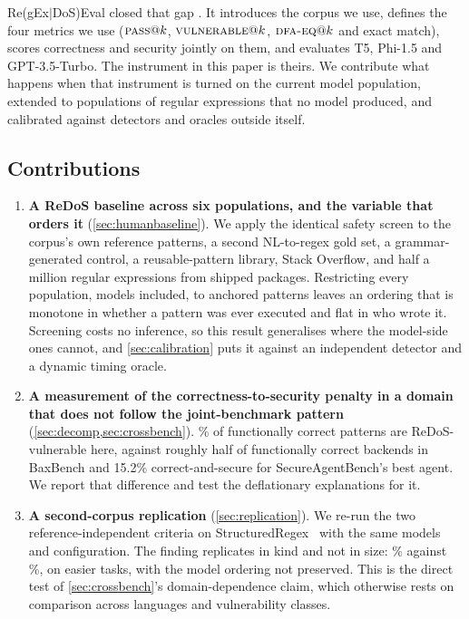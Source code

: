 \documentclass[11pt]{article}
\newcommand{\pass}{\textsc{pass}}
\newcommand{\vuln}{\textsc{vulnerable}}
\newcommand{\dfaeq}{\textsc{dfa-eq}}
\begin{document}
Re(gEx$|$DoS)Eval closed that gap \citep{siddiq2024regexeval}. It
introduces the corpus we use, defines the four metrics we use
($\pass{}@k$, $\vuln{}@k$, $\dfaeq{}@k$ and exact match), scores correctness
and security jointly on them, and evaluates T5, Phi-1.5 and GPT-3.5-Turbo.
The instrument in this paper is theirs. We contribute what happens when that
instrument is turned on
the current model population, extended to populations of regular expressions
that no model produced, and calibrated against detectors and oracles outside
itself.

\subsection{Contributions}

\begin{enumerate}
  \item \textbf{A ReDoS baseline across six populations, and the variable
  that orders it} (\cref{sec:humanbaseline}). We apply the identical safety
  screen to the corpus's own reference patterns, a second NL-to-regex gold
  set, a grammar-generated control, a reusable-pattern library, Stack
  Overflow, and half a million regular expressions from shipped packages.
  Restricting every population, models included, to anchored patterns leaves
  an ordering that is monotone in whether a pattern was ever executed and
  flat in who wrote it. Screening costs no inference, so this result
  generalises where the model-side ones cannot, and \cref{sec:calibration}
  puts it against an independent detector and a dynamic timing oracle.

  \item \textbf{A measurement of the correctness-to-security penalty in a
  domain that does not follow the joint-benchmark pattern}
  (\cref{sec:decomp,sec:crossbench}). \vulngivencorrect{}\% of functionally
  correct patterns are ReDoS-vulnerable here, against roughly half of
  functionally correct backends in BaxBench and 15.2\% correct-and-secure for
  SecureAgentBench's best agent. We report that difference and test the
  deflationary explanations for it.

  \item \textbf{A second-corpus replication} (\cref{sec:replication}). We
  re-run the two reference-independent criteria on
  StructuredRegex~\citep{ye2020structuredregex} with the same models and
  configuration. The finding replicates in kind and not in size:
  \srvulngivencorrect{}\% against \vulngivencorrect{}\%, on easier tasks, with
  the model ordering not preserved. This is the direct test of
  \cref{sec:crossbench}'s domain-dependence claim, which otherwise rests on
  comparison across languages and vulnerability classes.


\end{enumerate}
\end{document}
